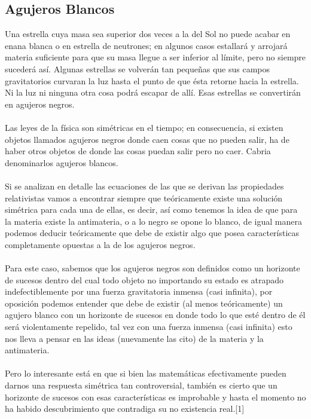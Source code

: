 \documentclass[12pt]{article}
\begin{document}
\subsection{Agujeros Blancos}
Una estrella cuya masa sea superior dos veces a la del Sol no puede acabar en enana blanca o en estrella de neutrones; en algunos casos estallará y arrojará materia suficiente para que su masa llegue a ser inferior al límite, pero no siempre sucederá así. Algunas estrellas se volverán tan pequeñas que sus campos gravitatorios curvaran la luz hasta el punto de que ésta retorne hacia la estrella. Ni la luz ni ninguna otra cosa podrá escapar de allí. Esas estrellas se convertirán en agujeros negros. 
\\\\Las leyes de la física son simétricas en el tiempo; en consecuencia, si existen objetos llamados agujeros negros donde caen cosas que no pueden salir, ha de haber otros objetos de donde las cosas puedan salir pero no caer. Cabria denominarlos agujeros blancos.\\\\
Si se analizan en detalle las ecuaciones de las que se derivan las propiedades relativistas vamos a encontrar siempre que teóricamente existe una solución simétrica para cada una de ellas, es decir, así como tenemos la idea de que para la materia existe la antimateria, o a lo negro se opone lo blanco, de igual manera podemos deducir teóricamente que debe de existir algo que posea características completamente opuestas a la de los agujeros negros.
\\\\
Para este caso, sabemos que los agujeros negros son definidos como un horizonte de sucesos dentro del cual todo objeto no importando su estado es atrapado indefectiblemente por una fuerza gravitatoria inmensa (casi infinita), por oposición podemos entender que debe de existir (al menos teóricamente) un agujero blanco con un horizonte de sucesos en donde todo lo que esté dentro de él será violentamente repelido, tal vez con una fuerza inmensa (casi infinita) esto nos lleva a pensar en las ideas (nuevamente las cito) de la materia y la antimateria. 
\\\\
Pero lo interesante está en que si bien las matemáticas efectivamente pueden darnos una respuesta simétrica tan controversial, también es cierto que un horizonte de sucesos con esas características es improbable y hasta el momento no ha habido descubrimiento que contradiga su no existencia real.[1]
\\\\%
\end{document}
